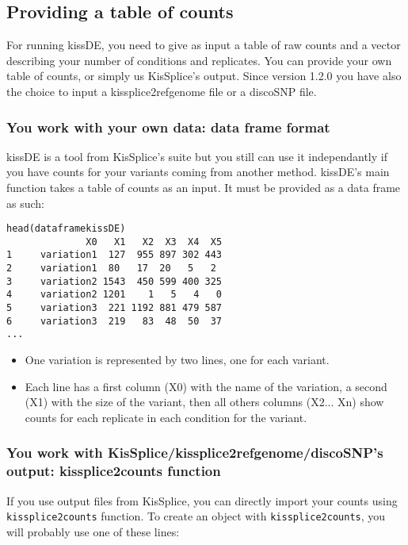 \documentclass[english, a4paper, 12pt]{article}
\begin{document}

\subsection{Providing a table of counts}
For running kissDE, you need to give as input a table of raw counts and a vector describing your number of conditions and replicates.
You can provide your own table of counts, or simply us KisSplice's output. Since version 1.2.0 you have also the choice to 
input a kissplice2refgenome file or a discoSNP file.



\subsubsection{You work with your own data: data frame format}
kissDE is a tool from KisSplice's suite but you still can use it independantly if you have counts for your variants coming from another method. kissDE's main function takes a table of counts as an input. It must be provided as a data frame as such:\\
\begin{verbatim}
head(dataframekissDE)
              X0   X1   X2  X3  X4  X5
1     variation1  127  955 897 302 443
2     variation1  80   17  20   5   2
3     variation2 1543  450 599 400 325
4     variation2 1201    1   5   4   0
5     variation3  221 1192 881 479 587
6     variation3  219   83  48  50  37
...
\end{verbatim}
\begin{itemize}
 \item One variation is represented by two lines, one for each variant.
 \item Each line has a first column (X0) with the name of the variation, a second (X1) with the size of the variant, then all others columns (X2... Xn) show counts for each replicate in each condition for the variant.
\end{itemize}

\subsubsection{You work with KisSplice/kissplice2refgenome/discoSNP's output: kissplice2counts function}
If you use output files from KisSplice, you can directly import your counts using \texttt{kissplice2counts} function.
To create an object with \texttt{kissplice2counts}, you will probably use one of these lines:\\
\end{document}

